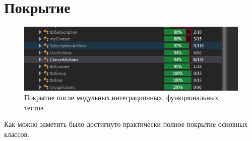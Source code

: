 \section{Покрытие}
\begin{figure} [h]
	\centering
	\includegraphics[scale=1]{CoverFunctional.PNG}
	\caption{Покрытие после модульных,интеграционных, функциональных тестов}
	\label{image:cover-functional}
\end{figure}
Как можно заметить было достигнуто практически полное покрытие основных классов.